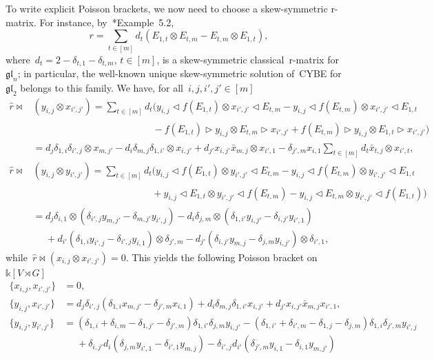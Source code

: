 \documentclass[12pt, reqno]{amsart}
\newcommand{\wh}[1]{\widehat{#1}}
\theoremstyle{definition}
\numberwithin{equation}{section}
\newcommand{\tensor}{\otimes}
\newcommand{\kk}{\mathbb{k}}\newcommand{\lie}[1]{{\mathfrak{#1}}}
\begin{document}
To write explicit Poisson brackets, we now need to choose a skew-symmetric r-matrix. For instance, by~\cite{GG}*{Example~5.2},
\begin{equation}\label{eq:skew symm r matr GLm}
r=\sum_{t\in[m]}d_t (E_{1,t}\tensor E_{t,m}-E_{t,m}\tensor E_{1,t}),
\end{equation}
where~$d_t=2-\delta_{t,1}-\delta_{t,m}$, $t\in [m]$, is a skew-symmetric
classical~r-matrix for~$\lie{gl}_n$; in particular, the well-known unique skew-symmetric
solution of~CYBE for~$\lie{gl}_2$ belongs to this family. 
We have, for all~$i,j,i',j'\in[m]$ 
\begin{align*}
\wh r\bowtie &(y_{i,j}\tensor x_{i',j'})= 
\sum_{t\in[m]} d_t \Big(y_{i,j}\triangleleft f(E_{1,t})\tensor x_{i',j'}\triangleleft 
E_{t,m}-y_{i,j}\triangleleft f(E_{t,m})\tensor x_{i',j'}\triangleleft 
E_{1,t}\\
&\phantom{(y_{i,j}\tensor x_{i',j'})=\sum_{t\in[m]}d_t} -f(E_{1,t})\triangleright y_{i,j}\tensor 
E_{t,m}\triangleright x_{i',j'}+f(E_{t,m})\triangleright y_{i,j}\tensor 
E_{1,t}\triangleright x_{i',j'}\Big)\\
&=d_j \delta_{1,i}
\delta_{i',j}\tensor x_{m,j'}-
d_i \delta_{m,j}\delta_{1,i'} \tensor x_{i,j'}+d_{j'} x_{i,j'}\bar x_{m,j}
\tensor 
x_{i',1}-\delta_{j',m}
x_{i,1}\sum_{t\in[m]}d_t \bar x_{t,j}
\tensor 
x_{i',t},\\
\wh r\bowtie &(y_{i,j}\tensor y_{i',j'})= 
\sum_{t\in[m]} d_t \Big(y_{i,j}\triangleleft f(E_{1,t})\tensor y_{i',j'}\triangleleft 
E_{t,m}-y_{i,j}\triangleleft f(E_{t,m})\tensor y_{i',j'}\triangleleft 
E_{1,t}\\
&\phantom{(y_{i,j}\tensor y_{i',j'})=\sum_{t\in[m]}d_t}+y_{i,j}\triangleleft E_{1,t}\tensor y_{i',j'}\triangleleft 
f(E_{t,m})-y_{i,j}\triangleleft E_{t,m}\tensor y_{i',j'}\triangleleft 
f(E_{1,t})\Big)\\
&= 
d_j \delta_{i,1}\tensor (\delta_{i',j} y_{m,j'}-\delta_{m,j'}y_{i',j})-d_i \delta_{j,m}\tensor (\delta_{1,i'}y_{i,j'}-\delta_{i,j'}y_{i',1})\\
&\phantom{=}+ d_{i'} (\delta_{1,i} y_{i',j}-\delta_{i',j}y_{i,1})\tensor \delta_{j',m}
-d_{j'} (\delta_{i,j'} y_{m,j}-\delta_{j,m}y_{i,j'})\tensor \delta_{i',1},
\end{align*}
while~$\wh r\bowtie (x_{i,j}\tensor x_{i',j'})=0$.
This yields the following Poisson bracket on~$\kk[V\rtimes G]$
\begin{align}
\{x_{i,j},x_{i',j'}\}&=0,\nonumber\\
\{y_{i,j},x_{i',j'}\}&=d_j \delta_{i',j}(\delta_{1,i}
x_{m,j'}-\delta_{j',m}
x_{i,1})+
d_i \delta_{m,j}\delta_{1,i'} x_{i,j'}+d_{j'} x_{i,j'}\bar x_{m,j}
x_{i',1},\nonumber\\
\{y_{i,j},y_{i',j'}\}&=
(\delta_{1,i}+\delta_{i,m}-\delta_{1,j'}-\delta_{j',m})\delta_{1,i'}\delta_{j,m} y_{i,j'}-
(\delta_{1,i'}+\delta_{i',m}-\delta_{1,j}-\delta_{j,m})\delta_{1,i}\delta_{j',m}y_{i',j}\nonumber\\
&\phantom{=}+\delta_{i,j'}d_i (\delta_{j,m} y_{i',1}-\delta_{i',1}y_{m,j})
-\delta_{i',j}d_{i'}(\delta_{j',m}y_{i,1}-\delta_{i,1} y_{m,j'})\label{eq:Lie algebra V*}
\end{align}
\end{document}

